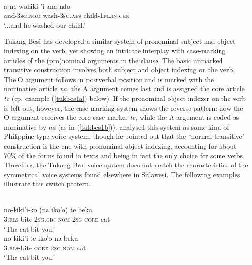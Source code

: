 \ea \label{tolaki1}
\\
\gll a-no wohiki-'i ana-ndo \\
and-\textsc{3}\textsc{sg}.\textsc{nom} wash-\textsc{3}\textsc{sg}.\textsc{abs} child-\textsc{1}\textsc{pl}.\textsc{in}.\textsc{gen} \\
\glft `...and he washed our child.'\\ 
\z

Tukang Besi has developed a similar system of pronominal subject and object indexing on the verb, yet showing an intricate interplay with case-marking articles of the (pro)nominal arguments in the clause. The basic unmarked transitive construction involves both subject and object indexing on the verb. The O argument follows in postverbal position and is marked with the nominative article \textit{na}, the A argument comes last and is assigned the core article \textit{te} (cp. example (\ref{tukbes1a}) below). If the pronominal object indexer on the verb is left out, however, the case-marking system shows the reverse pattern: now the O argument receives the core case marker \textit{te}, while the A argument is coded as nominative by \textit{na} (as in (\ref{tukbes1b})). \citep[53]{donohue1999} analysed this system as some kind of Philippine-type voice system, though he pointed out that the ``normal transitive" construction is the one with pronominal object indexing, accounting for about 70\% of the forms found in texts and being in fact the only choice for some verbs. Therefore, the Tukang Besi voice system does not match the characteristics of the symmetrical voice systems found elsewhere in Sulawesi. The following examples illustrate this switch pattern.

\ea 
{}\\
\ea \label{tukbes1a}
\gll no-kiki'i-ko (na iko'o) te beka \\
\textsc{3}.\textsc{rls}-bite-\textsc{2}\textsc{sg}.\textsc{obj} \textsc{nom} \textsc{2}\textsc{sg} \textsc{core} cat \\
\glft `The cat bit you.' \\ 
\ex \label{tukbes1b}
\gla no-kiki'i te iko'o na beka \\ 
\textsc{3}.\textsc{rls}-bite \textsc{core} \textsc{2}\textsc{sg} \textsc{nom} cat \\
\glft `The cat bit you.'\\ 
\z
\z

